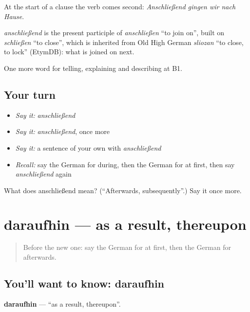 At the start of a clause the verb comes second: \emph{Anschließend gingen wir nach Hause}.

\begin{cousinweb}
\emph{anschließend} is the present participle of \emph{anschließen} \textquotedblleft{}to join on\textquotedblright{}, built on \emph{schließen} \textquotedblleft{}to close\textquotedblright{}, which is inherited from Old High German \emph{sliozan} \textquotedblleft{}to close, to lock\textquotedblright{} (EtymDB): what is joined on next.
\end{cousinweb}

\begin{grammarlens}[title={What you've built}]
One more word for telling, explaining and describing at B1.
\end{grammarlens}

\subsection*{Your turn}
\begin{itemize}
\raggedright
  \item \emph{Say it:} \emph{anschließend}
  \item \emph{Say it:} \emph{anschließend}, once more
  \item \emph{Say it:} a sentence of your own with \emph{anschließend}
  \item \emph{Recall:} say the German for during, then the German for at first, then say \emph{anschließend} again
\end{itemize}

\begin{tcolorbox}[breakable,colback=teal!4,colframe=teal!35!black,title={Before you move on}]
What does anschließend mean? (\textquotedblleft{}Afterwards, subsequently\textquotedblright{}.) Say it once more.
\end{tcolorbox}
\section[daraufhin]{daraufhin — as a result, thereupon}

\label{lesson:GE-C262-daraufhin}



\begin{quote}
Before the new one: say the German for at first, then the German for afterwards.
\end{quote}

\subsection*{You'll want to know: daraufhin}
\textbf{daraufhin} — \textquotedblleft{}as a result, thereupon\textquotedblright{}.

